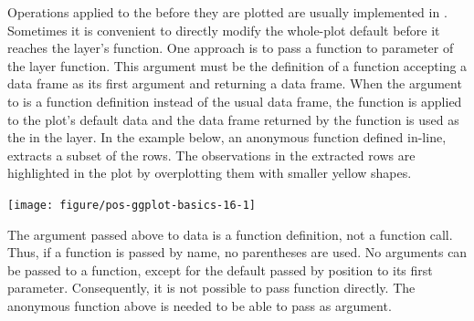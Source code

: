 \documentclass[krantz2]{krantz}\usepackage{knitr}
\begin{document}
\begin{explainbox}
Operations applied to the  before they are plotted are usually implemented in . Sometimes it is convenient to directly modify the whole-plot default  before it reaches the layer's  function. One approach is to pass a function to parameter  of the layer function. This argument must be the definition of a function accepting a data frame as its first argument and returning a data frame. When the argument to  is a function definition instead of the usual data frame, the function is applied to the plot's default data and the data frame returned by the function is used as the  in the layer. In the example below, an anonymous function defined in-line, extracts a subset of the rows. The observations in the extracted rows are highlighted in the plot by overplotting them with smaller yellow shapes.

\begin{knitrout}\footnotesize
{}\color{fgcolor}\begin{kframe}
\begin{alltt}
\hlstd{(} 
        \hlstd{=} \hlstd{(}    \hlopt{+}
  \hlstd{(} \hlstd{=} \hlstd{)} \hlopt{+}
  \hlstd{(} \hlstd{=} \hlstd{(}\hlstd{)\{}\hlstd{(}  \hlopt{==} \hlstd{)\},}
              \hlstd{=} \hlstd{,}  \hlstd{=} \hlstd{)}
\end{alltt}
\end{kframe}

{\centering \texttt{[image: figure/pos-ggplot-basics-16-1]} 

}


\end{knitrout}

The argument passed above to data is a function definition, not a function call. Thus, if a function is passed by name, no parentheses are used. No arguments can be passed to a function, except for the default  passed by position to its first parameter. Consequently, it is not possible to pass function  directly. The anonymous function above is needed to be able to pass  as argument.


\end{explainbox}
\end{document}
